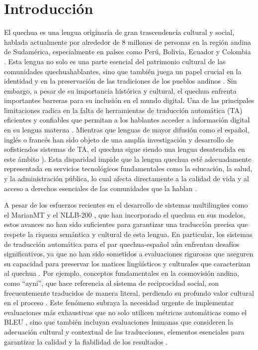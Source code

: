 \chapter{Introducción}

El quechua es una lengua originaria de gran trascendencia cultural y social, hablada actualmente por alrededor de 8 millones de personas en la región andina de Sudamérica, especialmente en países como Perú, Bolivia, Ecuador y Colombia \cite{adelaar2004}. Esta lengua no solo es una parte esencial del patrimonio cultural de las comunidades quechuahablantes, sino que también juega un papel crucial en la identidad y en la preservación de las tradiciones de los pueblos andinos \cite{cerron2003linguistica}. Sin embargo, a pesar de su importancia histórica y cultural, el quechua enfrenta importantes barreras para su inclusión en el mundo digital. Una de las principales limitaciones radica en la falta de herramientas de traducción automática (TA) eficientes y confiables que permitan a los hablantes acceder a información digital en su lengua materna \cite{joshi2020}. Mientras que lenguas de mayor difusión como el español, inglés o francés han sido objeto de una amplia investigación y desarrollo de sofisticados sistemas de TA, el quechua sigue siendo una lengua desatendida en este ámbito \cite{torres2023}). Esta disparidad impide que la lengua quechua esté adecuadamente representada en servicios tecnológicos fundamentales como la educación, la salud, y la administración pública, lo cual afecta directamente a la calidad de vida y al acceso a derechos esenciales de las comunidades que la hablan \cite{bird2020}.

A pesar de los esfuerzos recientes en el desarrollo de sistemas multilingües como el MarianMT \cite{junczys2018} y el NLLB-200 \cite{team2022no}, que han incorporado el quechua en sus modelos, estos avances no han sido suficientes para garantizar una traducción precisa que respete la riqueza semántica y cultural de esta lengua. En particular, los sistemas de traducción automática para el par quechua-español aún enfrentan desafíos significativos, ya que no han sido sometidos a evaluaciones rigurosas que aseguren su capacidad para preservar los matices lingüísticos y culturales que caracterizan al quechua \cite{rios2021}. Por ejemplo, conceptos fundamentales en la cosmovisión andina, como ``ayni'', que hace referencia al sistema de reciprocidad social, son frecuentemente traducidos de manera literal, perdiendo su profundo valor cultural en el proceso \cite{tiedemann2020opus}. Este fenómeno subraya la necesidad urgente de implementar evaluaciones más exhaustivas que no solo utilicen métricas automáticas como el BLEU \cite{papineni2002}, sino que también incluyan evaluaciones humanas que consideren la adecuación cultural y contextual de las traducciones, elementos esenciales para garantizar la calidad y la fiabilidad de los resultados \cite{lommel2014}.

